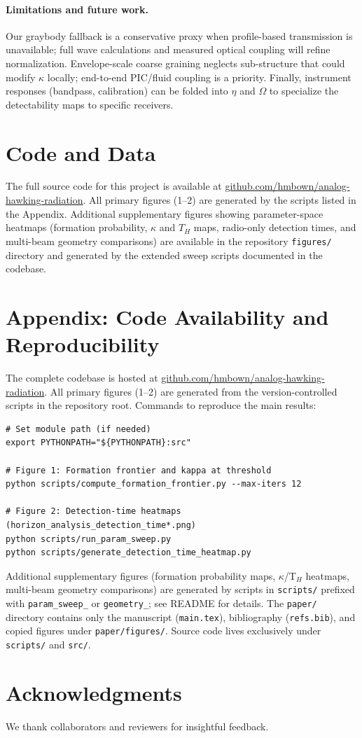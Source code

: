 \documentclass[11pt]{article}
\begin{document}
\paragraph{Limitations and future work.}
Our graybody fallback is a conservative proxy when profile-based transmission is unavailable; full wave calculations and measured optical coupling will refine normalization. Envelope-scale coarse graining neglects sub-structure that could modify $\kappa$ locally; end-to-end PIC/fluid coupling is a priority. Finally, instrument responses (bandpass, calibration) can be folded into $\eta$ and $\Omega$ to specialize the detectability maps to specific receivers.

\section{Code and Data}
The full source code for this project is available at \href{https://github.com/hmbown/analog-hawking-radiation}{github.com/hmbown/analog-hawking-radiation}. All primary figures (1--2) are generated by the scripts listed in the Appendix. Additional supplementary figures showing parameter-space heatmaps (formation probability, $\kappa$ and $T_H$ maps, radio-only detection times, and multi-beam geometry comparisons) are available in the repository \texttt{figures/} directory and generated by the extended sweep scripts documented in the codebase.

\appendix
\section*{Appendix: Code Availability and Reproducibility}
The complete codebase is hosted at \href{https://github.com/hmbown/analog-hawking-radiation}{github.com/hmbown/analog-hawking-radiation}. All primary figures (1--2) are generated from the version-controlled scripts in the repository root. Commands to reproduce the main results:
\begin{verbatim}
# Set module path (if needed)
export PYTHONPATH="${PYTHONPATH}:src"

# Figure 1: Formation frontier and kappa at threshold
python scripts/compute_formation_frontier.py --max-iters 12

# Figure 2: Detection-time heatmaps (horizon_analysis_detection_time*.png)
python scripts/run_param_sweep.py
python scripts/generate_detection_time_heatmap.py
\end{verbatim}
Additional supplementary figures (formation probability maps, $\kappa$/T$_H$ heatmaps, multi-beam geometry comparisons) are generated by scripts in \texttt{scripts/} prefixed with \texttt{param\_sweep\_} or \texttt{geometry\_}; see README for details. The \texttt{paper/} directory contains only the manuscript (\texttt{main.tex}), bibliography (\texttt{refs.bib}), and copied figures under \texttt{paper/figures/}. Source code lives exclusively under \texttt{scripts/} and \texttt{src/}.

\section*{Acknowledgments}
We thank collaborators and reviewers for insightful feedback.



\end{document}
